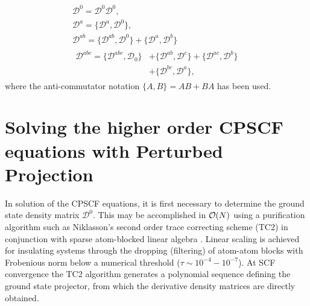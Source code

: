 \documentclass[prl,aps,preprint,showpacs,superbib]{revtex4}
\def\D{\mathcal{D}}
\begin{document}
\begin{gather}
  \D^{0} =\D^{0} \D^{0},\label{eq:anticommutators1}\\
  \D^{a} =\{\D^{a},\D^{0}\},\label{eq:anticommutators2}\\
  \D^{ab}=\{\D^{ab},\D^{0}\}+\{\D^{a},\D^{b}\}\label{eq:anticommutators3}\\
  \begin{split}
    \D^{abc}=\{\D^{abc},\D_0\}&+\{\D^{ab},\D^{c}\}+\{\D^{ac},\D^{b}\}\\
    &+\{\D^{bc},\D^{a}\}\label{eq:anticommutators4},
  \end{split}
\end{gather}
where the anti-commutator notation $\{A,B\} = AB+BA$ has been used.

\section{Solving the higher order CPSCF equations with Perturbed Projection}

In solution of the CPSCF equations, it is first necessary to determine the ground state density matrix $\mathcal{D}^0$.  This may 
be accomplished in ${\cal O}(N)$ using a purification algorithm such as Niklasson's \cite{ANiklasson02A} 
second order trace correcting scheme (TC2) in conjunction with sparse atom-blocked linear algebra 
\cite{ANiklasson03,MChallacombe00B}.  Linear scaling is achieved for insulating systems through 
the dropping (filtering) of atom-atom blocks with Frobenious norm below a numerical threshold 
($\tau \sim 10^{-4}-10^{-7}$).  At SCF convergence the TC2 algorithm generates a polynomial sequence 
defining the ground state projector, from which the derivative density matrices are directly obtained.
\end{document}

